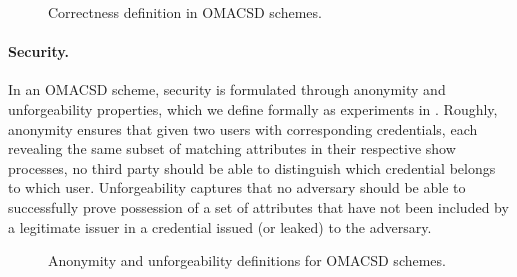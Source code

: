 \begin{figure}[ht!]
    \begin{center}
  \end{center}
  \caption{Correctness definition in OMACSD schemes.
    }
  \label{fig:omacsdcorr}
\end{figure}

\paragraph{Security.} %
In an OMACSD scheme, security is formulated through anonymity and unforgeability
properties, which we define formally as experiments in .
Roughly, anonymity ensures that given two users with corresponding credentials,
each revealing the same subset of matching attributes in their respective
show processes, no third party should be able to distinguish which credential
belongs to which user.  Unforgeability captures that no adversary should be
able to successfully prove possession of a set of attributes that have not been
included by a legitimate issuer in a credential issued (or leaked) to the
adversary.

\begin{figure}[ht!]
  \begin{center}
  \end{center}
  \caption{Anonymity and unforgeability definitions for OMACSD schemes.
    }
  \label{fig:omacsdsec}
\end{figure}

